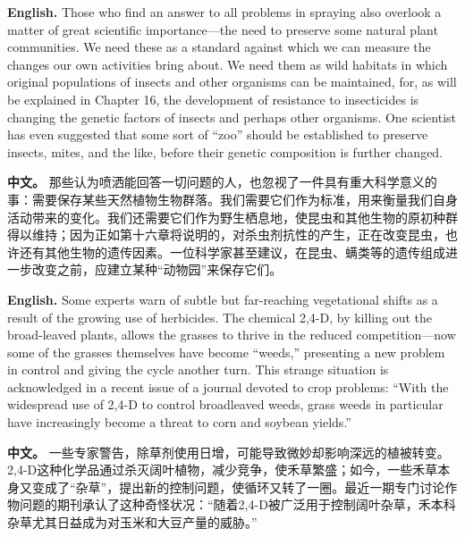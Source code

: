 \noindent\textbf{English.} Those who find an answer to all problems in spraying also overlook a matter of great scientific importance---the need to preserve some natural plant communities. We need these as a standard against which we can measure the changes our own activities bring about. We need them as wild habitats in which original populations of insects and other organisms can be maintained, for, as will be explained in Chapter 16, the development of resistance to insecticides is changing the genetic factors of insects and perhaps other organisms. One scientist has even suggested that some sort of ``zoo'' should be established to preserve insects, mites, and the like, before their genetic composition is further changed.
\par
\noindent\textbf{中文。} 那些认为喷洒能回答一切问题的人，也忽视了一件具有重大科学意义的事：需要保存某些天然植物生物群落。我们需要它们作为标准，用来衡量我们自身活动带来的变化。我们还需要它们作为野生栖息地，使昆虫和其他生物的原初种群得以维持；因为正如第十六章将说明的，对杀虫剂抗性的产生，正在改变昆虫，也许还有其他生物的遗传因素。一位科学家甚至建议，在昆虫、螨类等的遗传组成进一步改变之前，应建立某种“动物园”来保存它们。
\par\medskip

\noindent\textbf{English.} Some experts warn of subtle but far-reaching vegetational shifts as a result of the growing use of herbicides. The chemical 2,4-D, by killing out the broad-leaved plants, allows the grasses to thrive in the reduced competition---now some of the grasses themselves have become ``weeds,'' presenting a new problem in control and giving the cycle another turn. This strange situation is acknowledged in a recent issue of a journal devoted to crop problems: ``With the widespread use of 2,4-D to control broadleaved weeds, grass weeds in particular have increasingly become a threat to corn and soybean yields.''
\par
\noindent\textbf{中文。} 一些专家警告，除草剂使用日增，可能导致微妙却影响深远的植被转变。2,4-D这种化学品通过杀灭阔叶植物，减少竞争，使禾草繁盛；如今，一些禾草本身又变成了“杂草”，提出新的控制问题，使循环又转了一圈。最近一期专门讨论作物问题的期刊承认了这种奇怪状况：“随着2,4-D被广泛用于控制阔叶杂草，禾本科杂草尤其日益成为对玉米和大豆产量的威胁。”
\par\medskip

